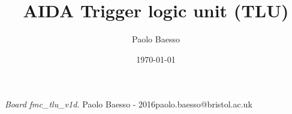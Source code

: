 \documentclass[10pt,twoside, fleqn]{memoir}
\author{Paolo Baesso}
\title{AIDA Trigger logic unit (TLU)}
\date{\today}
\makeatletter
\def\maketitle{%
  \null
  \thispagestyle{empty}%
  \vfill
  \begin{center}\leavevmode
    \normalfont
    {\LARGE\raggedleft \@author\par}%
    \hrulefill\par
    {\huge\raggedright \@title\par}%
    \vskip 1cm
  {\Large \@date\par}%
  \end{center}%
  \vfill
  \null
  \cleardoublepage
  }
\makeatother
\begin{document}
\let\cleardoublepage\clearpage


\maketitle
\frontmatter

\null\vfill
\begin{flushleft}
\textit{Board fmc\_tlu\_v1d.}\newline
\newline
Paolo Baesso - 2016\newline paolo.baesso@bristol.ac.uk
\bigskip

\end{flushleft}
\let\cleardoublepage\clearpage

\newpage
\tableofcontents

\mainmatter
\sloppy

\newenvironment{SpecialPar}
  {\begin{shaded}\noindent}
  {\end{shaded}}



\def\brd{FMC\_TLU\_v1d }
%
















%


\printglossaries
\printglossary[type=\acronymtype,title=Abbreviations]

%
%
\end{document}
